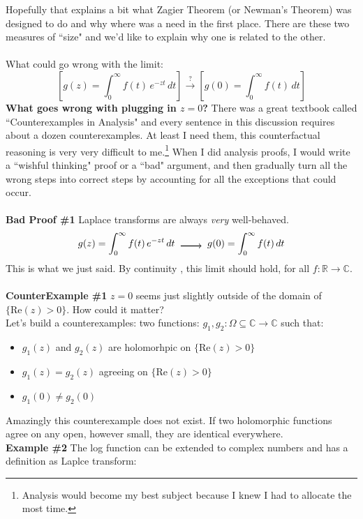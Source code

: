 \documentclass[12pt]{article}
\begin{document}
\newpage

\noindent Hopefully that explains a bit what Zagier Theorem (or Newman's Theorem) was designed to do and why where was a need in the first place.  There are these two measures of ``size" and we'd like to explain why one is related to the other. \\ \\
What could go wrong with the limit:
$$ \left[ g(z) = \int_0^\infty f(t) \, e^{-zt} \, dt\right] \stackrel{?}{\to} \left[ g(0) = \int_0^\infty f(t) \, dt \right] $$
\textbf{What goes wrong with plugging in $z = 0$?}   There was a great textbook called ``Counterexamples in Analysis" and every sentence in this discussion requires about a dozen counterexamples.  At least I need them, this counterfactual reasoning is very very difficult to me.\footnote{Analysis would become my best subject because I knew I had to allocate the most time.} When I did analysis proofs, I would write a ``wishful thinking" proof or a ``bad" argument, and then gradually turn all the wrong steps into correct steps by accounting for all the exceptions that could occur. \\ \\
\textbf{Bad Proof \#1} Laplace transforms are always \textit{very} well-behaved.  
$$ g(z) = \int_0^\infty f(t) \, e^{-zt} \, dt \;\; \tikz { \draw[thick,->] (0,0)--(0.75,0);} \;\; g(0) = \int_0^\infty f(t) \, dt $$
This is what we just said.  By {\color{blue!50!orange} continuity }, this limit should hold, for all $f: \mathbb{R} \to \mathbb{C}$. \\ \\
\textbf{CounterExample \#1} $z = 0$ seems just slightly outside of the domain of $\{ \text{Re}(z) > 0\}$.  How could it matter? \\
Let's build a counterexamples: two functions: $g_1, g_2 : \Omega \subseteq \mathbb{C} \to \mathbb{C}$ such that:
\begin{itemize}
\item $g_1(z)$ and $g_2(z)$ are holomorhpic on $\{ \text{Re}(z) > 0 \}$
\item $g_1(z) = g_2(z)$ agreeing on $\{ \text{Re}(z) > 0 \}$
\item $g_1(0) \neq g_2(0)$
\end{itemize} 
Amazingly this counterexample does not exist. If two holomorphic functions agree on any open, however small, they are identical everywhere.  \\
\textbf{Example \#2} The log function can be extended to complex numbers and has a definition as Laplce transform:
\end{document}
